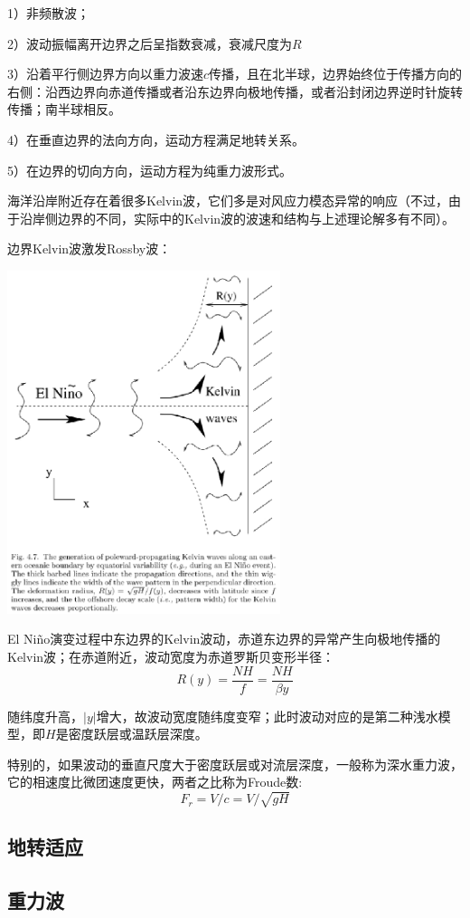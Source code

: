 \documentclass{article}
\begin{document}
1）非频散波；

2）波动振幅离开边界之后呈指数衰减，衰减尺度为$R$

3）沿着平行侧边界方向以重力波速$c$传播，且在北半球，边界始终位于传播方向的右侧：沿西边界向赤道传播或者沿东边界向极地传播，或者沿封闭边界逆时针旋转传播；南半球相反。

4）在垂直边界的法向方向，运动方程满足地转关系。

5）在边界的切向方向，运动方程为纯重力波形式。

海洋沿岸附近存在着很多Kelvin波，它们多是对风应力模态异常的响应（不过，由于沿岸侧边界的不同，实际中的Kelvin波的波速和结构与上述理论解多有不同）。

边界Kelvin波激发Rossby波：
\begin{center}
    \includegraphics[width=8cm]{Fig3_3.png}
\end{center}
El Niño演变过程中东边界的Kelvin波动，赤道东边界的异常产生向极地传播的Kelvin波；在赤道附近，波动宽度为赤道罗斯贝变形半径：
$$R(y) = \frac{NH}{f} = \frac{NH}{\beta y}$$

随纬度升高，$|y|$增大，故波动宽度随纬度变窄；此时波动对应的是第二种浅水模型，即$H$是密度跃层或温跃层深度。

特别的，如果波动的垂直尺度大于密度跃层或对流层深度，一般称为深水重力波，它的相速度比微团速度更快，两者之比称为Froude数:
$$F_r = V/c = V/\sqrt{gH}$$


\subsection{地转适应}
\subsection{重力波}
\end{document}
